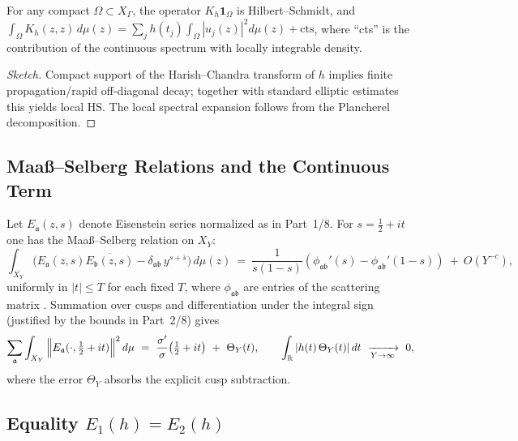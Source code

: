 \begin{lemma}\label{lem:local-HS}\relax
For any compact $\Omega\subset X_\Gamma$, the operator $K_h\mathbf{1}_\Omega$ is Hilbert–Schmidt, and $\int_\Omega K_h(z,z)\,d\mu(z)=\sum_j h(t_j)\int_{\Omega}|u_j(z)|^2d\mu(z)+\text{cts}$, where ``cts'' is the contribution of the continuous spectrum with locally integrable density. %
\end{lemma}

\begin{proof}[Sketch]\relax
Compact support of the Harish–Chandra transform of $h$ implies finite propagation/rapid off-diagonal decay; together with standard elliptic estimates this yields local HS. The local spectral expansion follows from the Plancherel decomposition. %
\end{proof}

\subsection{Maaß–Selberg Relations and the Continuous Term}\relax\hspace{0pt}
\label{subsec:Maass-Selberg}\relax\hspace{0pt}

Let $E_{\mathfrak{a}}(z,s)$ denote Eisenstein series normalized as in Part~1/8. For $s=\tfrac12+it$ one has the Maaß–Selberg relation on $X_Y$:
\[
\int_{X_Y}\Big(E_{\mathfrak{a}}(z,s)\overline{E_{\mathfrak{b}}(z,s)}-\delta_{\mathfrak{a}\mathfrak{b}}\,y^{s+\bar s}\Big)\,d\mu(z)
\ =\ \frac{1}{s(1-s)}\left(\phi_{\mathfrak{a}\mathfrak{b}}'(s)-\phi_{\mathfrak{a}\mathfrak{b}}'(1-s)\right)\ +\ O\!\left(Y^{-c}\right),
\]
uniformly in $|t|\le T$ for each fixed $T$, where $\phi_{\mathfrak{a}\mathfrak{b}}$ are entries of the scattering matrix \cite{Hejhal1983-II}. Summation over cusps and differentiation under the integral sign (justified by the bounds in Part~2/8) gives
\begin{equation}\label{eq:MS-global}\relax
\sum_{\mathfrak{a}}\int_{X_Y}\Big\|E_{\mathfrak{a}}(\cdot,\tfrac12+it)\Big\|^2\,d\mu
\ =\ \frac{\sigma'}{\sigma}\!\left(\tfrac12+it\right)\ +\ \Theta_Y(t),
\qquad \int_{\mathbb{R}}|h(t)\,\Theta_Y(t)|\,dt\ \xrightarrow[Y\to\infty]{}\ 0,
\end{equation}
where the error $\Theta_Y$ absorbs the explicit cusp subtraction. %

\subsection{Equality $E_{1}(h)=E_{2}(h)$}\relax\hspace{0pt}
\label{subsec:E1-equals-E2}\relax\hspace{0pt}

